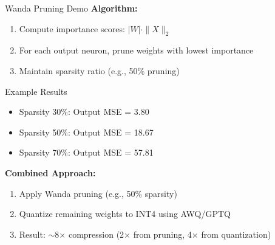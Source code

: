 \documentclass[aspectratio=169,10pt]{beamer}
\begin{document}
\begin{frame}[fragile]{Wanda Pruning Demo}
    \textbf{Algorithm:}
    \begin{enumerate}
        \item Compute importance scores: $|W| \cdot \|X\|_2$
        \item For each output neuron, prune weights with lowest importance
        \item Maintain sparsity ratio (e.g., 50\% pruning)
    \end{enumerate}

    \vspace{0.3cm}
    \begin{block}{Example Results}
        \begin{itemize}
            \item Sparsity 30\%: Output MSE = 3.80
            \item Sparsity 50\%: Output MSE = 18.67
            \item Sparsity 70\%: Output MSE = 57.81
        \end{itemize}
    \end{block}

    \vspace{0.3cm}
    \textbf{Combined Approach:}
    \begin{enumerate}
        \item Apply Wanda pruning (e.g., 50\% sparsity)
        \item Quantize remaining weights to INT4 using AWQ/GPTQ
        \item Result: $\sim$8$\times$ compression (2$\times$ from pruning, 4$\times$ from quantization)
    \end{enumerate}
\end{frame}
\end{document}
